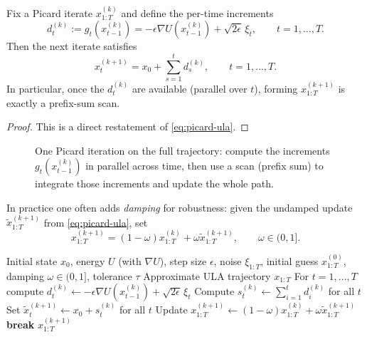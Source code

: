 \documentclass[11pt]{article}
\begin{document}
\begin{proposition}
\label{prop:picard-scan}
Fix a Picard iterate $x_{1:T}^{(k)}$ and define the per-time increments
\[
d_t^{(k)} := g_t\!\left(x_{t-1}^{(k)}\right)
=-\epsilon\nabla U(x_{t-1}^{(k)})+\sqrt{2\epsilon}\,\xi_t,\qquad t=1,\dots,T.
\]
Then the next iterate satisfies
\[
x_t^{(k+1)} = x_0 + \sum_{s=1}^t d_s^{(k)},\qquad t=1,\dots,T.
\]
In particular, once the $d_t^{(k)}$ are available (parallel over $t$), forming $x_{1:T}^{(k+1)}$ is exactly a prefix-sum scan.%
\end{proposition}
\begin{proof}
This is a direct restatement of \eqref{eq:picard-ula}.%
\end{proof}

\begin{figure}[t]
  \centering
  \resizebox{\linewidth}{!}{}
  \caption{One Picard iteration on the full trajectory: compute the increments $g_t(x_{t-1}^{(k)})$ in parallel across time, then use a scan (prefix sum) to integrate those increments and update the whole path.}
  \label{fig:parallel-mcmc-picard-pipeline}
\end{figure}

In practice one often adds \emph{damping} for robustness:
given the undamped update $\tilde x_{1:T}^{(k+1)}$ from \eqref{eq:picard-ula}, set
\[
x_{1:T}^{(k+1)}=(1-\omega)x_{1:T}^{(k)}+\omega \tilde x_{1:T}^{(k+1)},
\qquad \omega\in(0,1].
\]

\begin{algorithm}[H]
  \caption{Parallel-in-time Picard iteration for ULA with fixed noise (damped)}
  \label{alg:parallel-mcmc-picard}
  \begin{algorithmic}[1]
    \Require Initial state $x_0$, energy $U$ (with $\nabla U$), step size $\epsilon$, noise $\xi_{1:T}$, initial guess $x_{1:T}^{(0)}$, damping $\omega\in(0,1]$, tolerance $\tau$
    \Ensure Approximate ULA trajectory $x_{1:T}$
      \State For $t=1,\dots,T$ compute $d_t^{(k)} \gets -\epsilon\nabla U(x_{t-1}^{(k)})+\sqrt{2\epsilon}\,\xi_t$ 
      \State Compute $s_t^{(k)} \gets \sum_{i=1}^t d_i^{(k)}$ for all $t$ 
      \State Set $\tilde x_t^{(k+1)} \gets x_0 + s_t^{(k)}$ for all $t$
      \State Update $x_{1:T}^{(k+1)} \gets (1-\omega)x_{1:T}^{(k)}+\omega \tilde x_{1:T}^{(k+1)}$
        \State \textbf{break}
      \EndIf
    \EndFor
    \State \Return $x_{1:T}^{(k+1)}$
  \end{algorithmic}
\end{algorithm}
\end{document}
